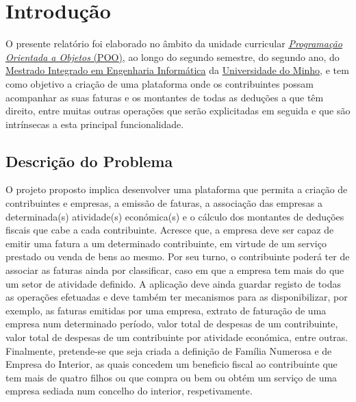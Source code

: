 \documentclass[a4paper]{article}
\begin{document}
\pagebreak


\tableofcontents


\pagebreak

\section{Introdução}
\label{sec:intro}

O presente relatório foi elaborado no âmbito da unidade curricular
\href{http://miei.di.uminho.pt/plano_estudos.html#programa_o_orientada_aos_objetos}
{\emph {Programação Orientada a Objetos} (POO)}, ao longo do segundo semestre,
do segundo ano, do \href{http://miei.di.uminho.pt}{Mestrado Integrado em Engenharia Informática}
da \href{https://www.uminho.pt}{Universidade do Minho}, e tem como objetivo a criação
de uma plataforma onde os contribuintes possam acompanhar as suas faturas e
os montantes de todas as deduções a que têm direito, entre muitas outras operações que
serão explicitadas em seguida e que são intrínsecas a esta principal funcionalidade.

\subsection{Descrição do Problema}
\label{sec:problema}

O projeto proposto implica desenvolver uma plataforma que permita a criação de
contribuintes e empresas, a emissão de faturas, a associação das empresas a
determinada(s) atividade(s) económica(s) e o cálculo dos montantes
de deduções fiscais que cabe a cada contribuinte.
Acresce que, a empresa deve ser capaz de emitir uma fatura a um determinado
contribuinte, em virtude de um serviço prestado ou venda de bens ao mesmo.
Por seu turno, o contribuinte poderá ter de associar as faturas ainda por classificar,
caso em que a empresa tem mais do que um setor de atividade definido.
A aplicação deve ainda guardar registo de todas as operações
efetuadas e deve também ter mecanismos para as disponibilizar, por exemplo,
as faturas emitidas por uma empresa, extrato de faturação de uma empresa num
determinado período, valor total de despesas de um contribuinte, valor total de
despesas de um contribuinte por atividade económica, entre outras.
Finalmente, pretende-se que seja criada a definição de Família Numerosa
e de Empresa do Interior, as quais concedem um beneficio fiscal ao contribuinte
que tem mais de quatro filhos ou que compra ou bem ou obtém um serviço de uma
empresa sediada num concelho do interior, respetivamente.
\end{document}
